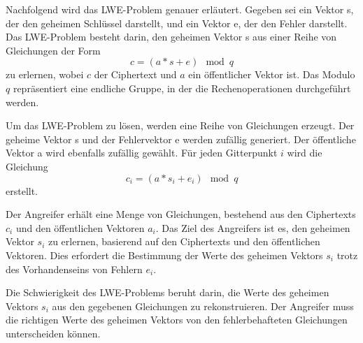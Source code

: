 Nachfolgend wird das LWE-Problem genauer erläutert.
Gegeben sei ein Vektor s, der den geheimen Schlüssel darstellt, und ein Vektor e, der den Fehler darstellt. 
Das LWE-Problem besteht darin, den geheimen Vektor s aus einer Reihe von Gleichungen der Form 
$$c = (a * s + e)\mod{q}$$ zu erlernen, wobei $c$ der Ciphertext und $a$ ein öffentlicher Vektor ist. 
Das Modulo $q$ repräsentiert eine endliche Gruppe, in der die Rechenoperationen durchgeführt werden.

Um das LWE-Problem zu lösen, werden eine Reihe von Gleichungen erzeugt. Der geheime Vektor s und der Fehlervektor e werden zufällig generiert. 
Der öffentliche Vektor a wird ebenfalls zufällig gewählt. Für jeden Gitterpunkt $i$ wird die Gleichung 
$$c_i = (a * s_i + e_i) \mod{q}$$ 
erstellt.

Der Angreifer erhält eine Menge von Gleichungen, bestehend aus den Ciphertexts $c_i$ und den öffentlichen Vektoren $a_i$. 
Das Ziel des Angreifers ist es, den geheimen Vektor $s_i$ zu erlernen, basierend auf den Ciphertexts und den öffentlichen Vektoren. 
Dies erfordert die Bestimmung der Werte des geheimen Vektors $s_i$ trotz des Vorhandenseins von Fehlern $e_i$.

Die Schwierigkeit des LWE-Problems beruht darin, die Werte des geheimen Vektors $s_i$ aus den gegebenen Gleichungen zu rekonstruieren. 
Der Angreifer muss die richtigen Werte des geheimen Vektors von den fehlerbehafteten Gleichungen unterscheiden können.


